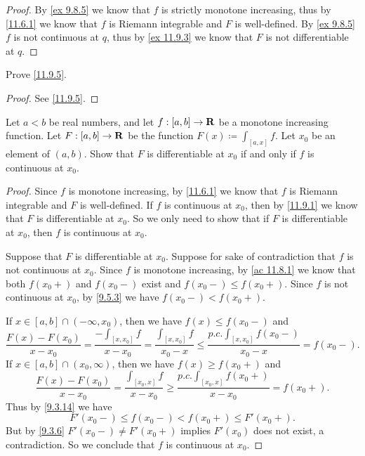 \begin{proof}
  By \cref{ex 9.8.5} we know that \(f\) is strictly monotone increasing, thus by \cref{11.6.1} we know that \(f\) is Riemann integrable and \(F\) is well-defined.
  By \cref{ex 9.8.5} \(f\) is not continuous at \(q\), thus by \cref{ex 11.9.3} we know that \(F\) is not differentiable at \(q\).
\end{proof}

\begin{exercise}\label{ex 11.9.2}
  Prove \cref{11.9.5}.
\end{exercise}

\begin{proof}
  See \cref{11.9.5}.
\end{proof}

\begin{exercise}\label{ex 11.9.3}
  Let \(a < b\) be real numbers, and let \(f : [a, b] \to \mathbf{R}\) be a monotone increasing function.
  Let \(F : [a, b] \to \mathbf{R}\) be the function \(F(x) \coloneqq \int_{[a, x]} f\).
  Let \(x_0\) be an element of \((a, b)\).
  Show that \(F\) is differentiable at \(x_0\) if and only if \(f\) is continuous at \(x_0\).
\end{exercise}

\begin{proof}
  Since \(f\) is monotone increasing, by \cref{11.6.1} we know that \(f\) is Riemann integrable and \(F\) is well-defined.
  If \(f\) is continuous at \(x_0\), then by \cref{11.9.1} we know that \(F\) is differentiable at \(x_0\).
  So we only need to show that if \(F\) is differentiable at \(x_0\), then \(f\) is continuous at \(x_0\).

  Suppose that \(F\) is differentiable at \(x_0\).
  Suppose for sake of contradiction that \(f\) is not continuous at \(x_0\).
  Since \(f\) is monotone increasing, by \cref{ac 11.8.1} we know that both \(f(x_0+)\) and \(f(x_0-)\) exist and \(f(x_0-) \leq f(x_0+)\).
  Since \(f\) is not continuous at \(x_0\), by \cref{9.5.3} we have \(f(x_0-) < f(x_0+)\).

  If \(x \in [a, b] \cap (-\infty, x_0)\), then we have \(f(x) \leq f(x_0-)\) and
  \[
    \frac{F(x) - F(x_0)}{x - x_0} = \frac{-\int_{[x, x_0]} f}{x - x_0} = \frac{\int_{[x, x_0]} f}{x_0 - x} \leq \frac{p.c. \int_{[x, x_0]} f(x_0-)}{x_0 - x} = f(x_0-).
  \]
  If \(x \in [a, b] \cap (x_0, \infty)\), then we have \(f(x) \geq f(x_0+)\) and
  \[
    \frac{F(x) - F(x_0)}{x - x_0} = \frac{\int_{[x_0, x]} f}{x - x_0} \geq \frac{p.c. \int_{[x_0, x]} f(x_0+)}{x - x_0} = f(x_0+).
  \]
  Thus by \cref{9.3.14} we have
  \[
    F'(x_0-) \leq f(x_0-) < f(x_0+) \leq F'(x_0+).
  \]
  But by \cref{9.3.6} \(F'(x_0-) \neq F'(x_0+)\) implies \(F'(x_0)\) does not exist, a contradiction.
  So we conclude that \(f\) is continuous at \(x_0\).
\end{proof}